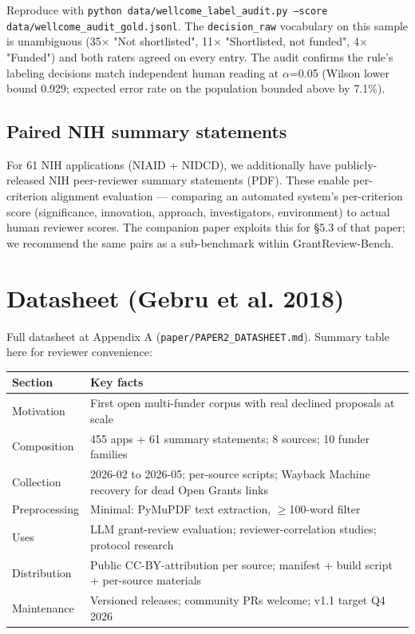 \documentclass[11pt]{article}
\begin{document}
Reproduce with \texttt{python data/wellcome\_label\_audit.py --score data/wellcome\_audit\_gold.jsonl}. The \texttt{decision\_raw} vocabulary on this sample is unambiguous (35$\times$ "Not shortlisted", 11$\times$ "Shortlisted, not funded", 4$\times$ "Funded") and both raters agreed on every entry. The audit confirms the rule's labeling decisions match independent human reading at $\alpha$=0.05 (Wilson lower bound 0.929; expected error rate on the population bounded above by 7.1\%).

\subsection{Paired NIH summary statements}

For 61 NIH applications (NIAID + NIDCD), we additionally have publicly-released NIH peer-reviewer summary statements (PDF). These enable per-criterion alignment evaluation --- comparing an automated system's per-criterion score (significance, innovation, approach, investigators, environment) to actual human reviewer scores. The companion paper exploits this for §5.3 of that paper; we recommend the same pairs as a sub-benchmark within GrantReview-Bench.

\section{Datasheet (Gebru et al. 2018)}

Full datasheet at Appendix A (\texttt{paper/PAPER2\_DATASHEET.md}). Summary table here for reviewer convenience:

\begin{table}[H]
\centering
\small
\begin{tabular}{ll}
\toprule
Section & Key facts \\
\midrule
Motivation & First open multi-funder corpus with real declined proposals at scale \\
Composition & 455 apps + 61 summary statements; 8 sources; 10 funder families \\
Collection & 2026-02 to 2026-05; per-source scripts; Wayback Machine recovery for dead Open Grants links \\
Preprocessing & Minimal: PyMuPDF text extraction, $\geq$100-word filter \\
Uses & LLM grant-review evaluation; reviewer-correlation studies; protocol research \\
Distribution & Public CC-BY-attribution per source; manifest + build script + per-source materials \\
Maintenance & Versioned releases; community PRs welcome; v1.1 target Q4 2026 \\
\bottomrule
\end{tabular}
\end{table}
\end{document}
